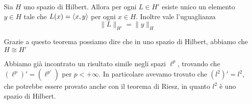 \begin{theorem}[di Riesz]\label{thm:riesz}
    Sia \(H\) uno spazio di Hilbert. Allora per ogni \(L \in H'\) esiste unico
    un elemento \(y \in H\) tale che \(L{(x)} = {\left\langle x, y\right\rangle} \) per ogni \(x \in
    H\). Inoltre vale l'uguaglianza
    \[
      \|L\|_{H'} = \|y\|_H
    \]
\end{theorem}
\begin{remark}
    Grazie a questo teorema possiamo dire che in uno spazio di Hilbert, abbiamo
    che \(H \cong H'\) 
\end{remark}
\begin{note}
    Abbiamo già incontrato un risultato simile negli spazi \(\ell^{p}\),
    trovando che \({(\ell^{p})}' = {(\ell^{p'})}\) per \(p < +\infty\). In
    particolare avevamo trovato che \({(l^2)}' = l^2\), che potrebbe essere
    provato anche con il teorema di Riesz, in quanto \(l^2\) è uno spazio di
    Hilbert.
\end{note}
